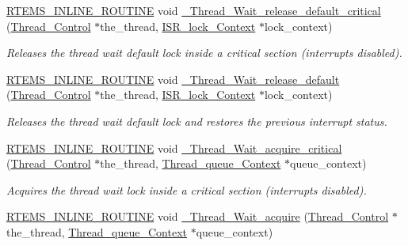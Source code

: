 \begin{DoxyCompactItemize}
\mbox{\hyperlink{group__RTEMSScoreBaseDefs_gac216239df231d5dbd15e3520b0b9313f}{R\+T\+E\+M\+S\+\_\+\+I\+N\+L\+I\+N\+E\+\_\+\+R\+O\+U\+T\+I\+NE}} void \mbox{\hyperlink{group__RTEMSScoreThread_ga1379d753ea2866e64eed15cd7ea7fb38}{\+\_\+\+Thread\+\_\+\+Wait\+\_\+release\+\_\+default\+\_\+critical}} (\mbox{\hyperlink{struct__Thread__Control}{Thread\+\_\+\+Control}} $\ast$the\+\_\+thread, \mbox{\hyperlink{structISR__lock__Context}{I\+S\+R\+\_\+lock\+\_\+\+Context}} $\ast$lock\+\_\+context)
\begin{DoxyCompactList}\small\item\em Releases the thread wait default lock inside a critical section (interrupts disabled). \end{DoxyCompactList}\item 
\mbox{\hyperlink{group__RTEMSScoreBaseDefs_gac216239df231d5dbd15e3520b0b9313f}{R\+T\+E\+M\+S\+\_\+\+I\+N\+L\+I\+N\+E\+\_\+\+R\+O\+U\+T\+I\+NE}} void \mbox{\hyperlink{group__RTEMSScoreThread_gacea1194022db2bc960f47a74946aed8c}{\+\_\+\+Thread\+\_\+\+Wait\+\_\+release\+\_\+default}} (\mbox{\hyperlink{struct__Thread__Control}{Thread\+\_\+\+Control}} $\ast$the\+\_\+thread, \mbox{\hyperlink{structISR__lock__Context}{I\+S\+R\+\_\+lock\+\_\+\+Context}} $\ast$lock\+\_\+context)
\begin{DoxyCompactList}\small\item\em Releases the thread wait default lock and restores the previous interrupt status. \end{DoxyCompactList}\item 
\mbox{\hyperlink{group__RTEMSScoreBaseDefs_gac216239df231d5dbd15e3520b0b9313f}{R\+T\+E\+M\+S\+\_\+\+I\+N\+L\+I\+N\+E\+\_\+\+R\+O\+U\+T\+I\+NE}} void \mbox{\hyperlink{group__RTEMSScoreThread_ga31d2b044df5bb8998e4c935fededc17c}{\+\_\+\+Thread\+\_\+\+Wait\+\_\+acquire\+\_\+critical}} (\mbox{\hyperlink{struct__Thread__Control}{Thread\+\_\+\+Control}} $\ast$the\+\_\+thread, \mbox{\hyperlink{structThread__queue__Context}{Thread\+\_\+queue\+\_\+\+Context}} $\ast$queue\+\_\+context)
\begin{DoxyCompactList}\small\item\em Acquires the thread wait lock inside a critical section (interrupts disabled). \end{DoxyCompactList}\item 
\mbox{\hyperlink{group__RTEMSScoreBaseDefs_gac216239df231d5dbd15e3520b0b9313f}{R\+T\+E\+M\+S\+\_\+\+I\+N\+L\+I\+N\+E\+\_\+\+R\+O\+U\+T\+I\+NE}} void \mbox{\hyperlink{group__RTEMSScoreThread_gaa8ad190d2fb384bff871065b7e885c90}{\+\_\+\+Thread\+\_\+\+Wait\+\_\+acquire}} (\mbox{\hyperlink{struct__Thread__Control}{Thread\+\_\+\+Control}} $\ast$the\+\_\+thread, \mbox{\hyperlink{structThread__queue__Context}{Thread\+\_\+queue\+\_\+\+Context}} $\ast$queue\+\_\+context)

\end{DoxyCompactItemize}
